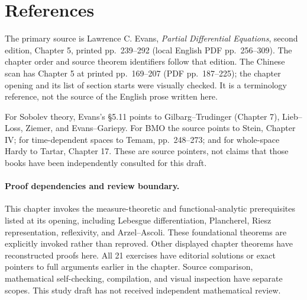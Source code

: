 \section{References}
\label{sec:5-11}

The primary source is Lawrence C. Evans, \emph{Partial Differential
Equations}, second edition, Chapter 5, printed pp.~239--292
(local English PDF pp.~256--309). The chapter order and source theorem
identifiers follow that edition. The Chinese scan has Chapter 5 at
printed pp.~169--207 (PDF pp.~187--225); the chapter opening and its
list of section starts were visually checked. It is a terminology
reference, not the source of the English prose written here.

For Sobolev theory, Evans's \S5.11 points to
Gilbarg--Trudinger (Chapter 7), Lieb--Loss, Ziemer, and Evans--Gariepy.
For BMO the source points to Stein, Chapter IV; for time-dependent
spaces to Temam, pp.~248--273; and for whole-space Hardy to Tartar,
Chapter 17. These are source pointers, not claims that those books
have been independently consulted for this draft.

\paragraph{Proof dependencies and review boundary.}
This chapter invokes the measure-theoretic and functional-analytic
prerequisites listed at its opening, including Lebesgue differentiation,
Plancherel, Riesz representation, reflexivity, and Arzel--Ascoli.
These foundational theorems are explicitly invoked rather than reproved.
Other displayed chapter theorems have reconstructed proofs here.
All 21 exercises have editorial solutions or exact pointers to full
arguments earlier in the chapter. Source comparison, mathematical
self-checking, compilation, and visual inspection have separate scopes.
This study draft has not received independent mathematical review.
